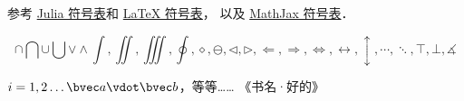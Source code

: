 
参考 \href{https://docs.julialang.org/en/v1/manual/unicode-input/}{Julia 符号表}和 \href{https://oeis.org/wiki/List_of_LaTeX_mathematical_symbols}{LaTeX 符号表}， 以及 \href{http://www.onemathematicalcat.org/MathJaxDocumentation/TeXSyntax.htm#U}{MathJax 符号表}．

\begin{equation}\label{test_eq1}
\cap\bigcap\cup\bigcup\vee\wedge\int, \iint, \iiint, \oint, \diamond, \ominus, \triangleleft, \triangleright, \Longleftarrow, \Longrightarrow, \iff, \leftrightarrow, \updownarrow, \cdots, \ddots, \top, \bot, \measuredangle
\end{equation}

$i = 1, 2\dots \bvec a \vdot \bvec b$，等等…… 《书名·好的》
